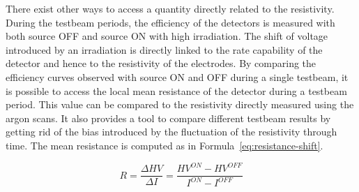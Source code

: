 	There exist other ways to access a quantity directly related to the resistivity. During the testbeam periods, the efficiency of the detectors is measured with both source OFF and source ON with high irradiation. The shift of voltage introduced by an irradiation is directly linked to the rate capability of the detector and hence to the resistivity of the electrodes. By comparing the efficiency curves observed with source ON and OFF during a single testbeam, it is possible to access the local mean resistance of the detector during a testbeam period. This value can be compared to the resistivity directly measured using the argon scans. It also provides a tool to compare different testbeam results by getting rid of the bias introduced by the fluctuation of the resistivity through time. The mean resistance is computed as in Formula~\ref{eq:resistance-shift}.
	
	\begin{equation}
	\label{eq:resistance-shift}
	R = \frac{\Delta HV}{\Delta I} = \frac{HV^{ON} - HV^{OFF}}{I^{ON} - I^{OFF}}
	\end{equation}
	
